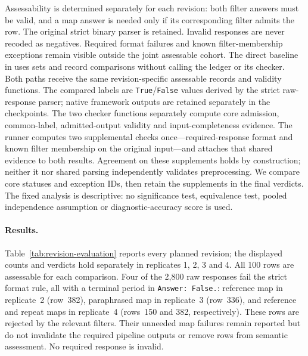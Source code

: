 \documentclass[11pt]{article}
\begin{document}
Assessability is determined separately for each revision: both filter
answers must be valid, and a map answer is needed only if its corresponding
filter admits the row. The original strict binary parser is retained.
Invalid responses are never recoded as negatives. Required format failures
and known filter-membership exceptions remain visible outside the joint
assessable cohort. The direct baseline in
 uses sets and record comparisons
without calling the ledger or its checker. Both paths receive the same
revision-specific assessable records and validity functions. The compared
labels are \texttt{True}/\texttt{False} values derived by the strict raw-response
parser; native framework outputs are retained separately in the checkpoints.
The two checker functions separately compute core admission, common-label,
admitted-output validity and input-completeness evidence. The runner computes
two supplemental checks once---required-response format and known filter
membership on the original input---and attaches that shared evidence to both
results. Agreement on these supplements holds by construction; neither it
nor shared parsing independently validates preprocessing. We compare core
statuses and exception IDs, then retain the supplements in the final verdicts.
The fixed analysis is descriptive:
no significance test, equivalence test, pooled independence assumption or
diagnostic-accuracy score is used.

\paragraph{Results.}
Table~\ref{tab:revision-evaluation} reports every planned revision; the
displayed counts and verdicts hold separately in replicates 1, 2, 3 and 4.
All 100 rows are assessable for each comparison. Four of the 2,800 raw
responses fail the strict format rule, all with a terminal period in
\texttt{Answer: False.}: reference map in replicate~2 (row~382), paraphrased
map in replicate~3 (row~336), and reference and repeat maps in replicate~4
(rows~150 and 382, respectively). These rows are rejected by the relevant
filters. Their unneeded map failures remain reported but do not invalidate
the required pipeline outputs or remove rows from semantic assessment.
No required response is invalid.
\end{document}

